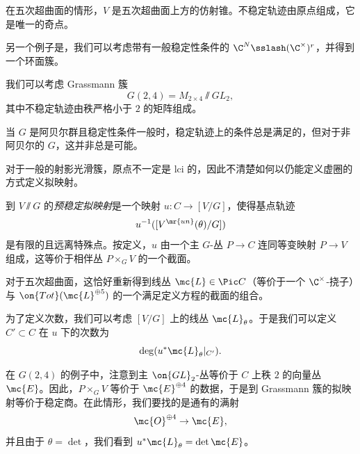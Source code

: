\begin{exm}
    在五次超曲面的情形，\(V\) 是五次超曲面上方的仿射锥。不稳定轨迹由原点组成，它是唯一的奇点。
\end{exm}

\begin{exm}
    另一个例子是，我们可以考虑带有一般稳定性条件的 \(\C^N \sslash (\C^{\times})^r\)，并得到一个环面簇。
\end{exm}

\begin{exm}
    我们可以考虑 Grassmann 簇
    \[ G(2,4) = M_{2\times 4} \sslash GL_2, \]
    其中不稳定轨迹由秩严格小于 \(2\) 的矩阵组成。
\end{exm}

\begin{rmk}
    当 \(G\) 是阿贝尔群且稳定性条件一般时，稳定轨迹上的条件总是满足的，但对于非阿贝尔的 \(G\)，这并非总是可能。
\end{rmk}

\begin{rmk}
    对于一般的射影光滑簇，原点不一定是 lci 的，因此不清楚如何以仍能定义虚圈的方式定义拟映射。
\end{rmk}

\begin{defn}
    到 \(V \sslash G\) 的\textit{预稳定拟映射}是一个映射 \(u \colon C \to [V/G]\)，使得基点轨迹
    \[ u^{-1}([V^{\mr{un}}(\theta) / G]) \]
    是有限的且远离特殊点。按定义，\(u\) 由一个主 \(G\)-丛 \(P \to C\) 连同等变映射 \(P \to V\) 组成，这等价于相伴丛 \(P \times_G V\) 的一个截面。
\end{defn}

\begin{exm}
    对于五次超曲面，这恰好重新得到线丛 \(\mc{L} \in \Pic C\)（等价于一个 \(\C^{\times}\)-挠子）与 \(\on{Tot}(\mc{L}^{\oplus 5})\) 的一个满足定义方程的截面的组合。
\end{exm}

为了定义次数，我们可以考虑 \([V/G]\) 上的线丛 \(\mc{L}_{\theta}\)。于是我们可以定义 \(C' \subset C\) 在 \(u\) 下的次数为
\[ \deg (u^* \mc{L}_{\theta}|_{C'}). \]

\begin{exm}
    在 \(G(2,4)\) 的例子中，注意到主 \(\on{GL}_2\)-丛等价于 \(C\) 上秩 \(2\) 的向量丛 \(\mc{E}\)。因此，\(P \times_G V\) 等价于 \(\mc{E}^{\oplus 4}\) 的数据，于是到 Grassmann 簇的拟映射等价于稳定商。在此情形，我们要找的是通有的满射
    \[ \mc{O}^{\oplus 4} \to \mc{E}, \]
    并且由于 \(\theta = \det\)，我们看到 \(u^* \mc{L}_{\theta} = \det \mc{E}\)。
\end{exm}

